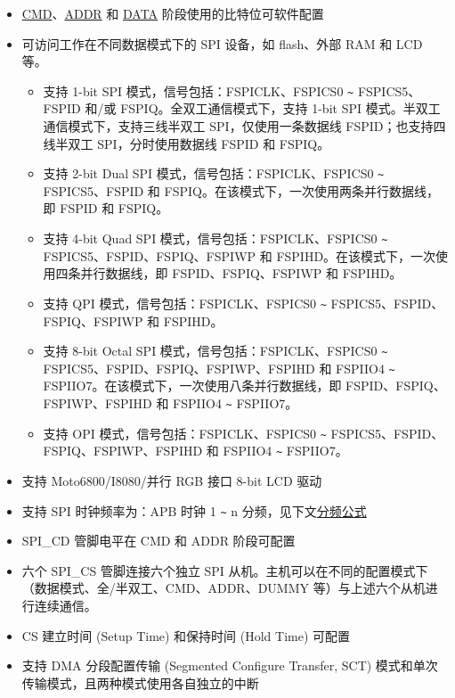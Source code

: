 \documentclass[main\_\_CN.tex]{subfiles}
\begin{document}
\begin{itemize}
    \item \hyperref[phase:cmd]{CMD}、\hyperref[phase:addr]{ADDR} 和 \hyperref[phase:data]{DATA} 阶段使用的比特位可软件配置
    \item 可访问工作在不同数据模式下的 SPI 设备，如 flash、外部 RAM 和 LCD 等。
    \begin{itemize}
      \item 支持 1-bit SPI 模式，信号包括：FSPICLK、FSPICS0 \verb+~+ FSPICS5、FSPID 和/或 FSPIQ。全双工通信模式下，支持 1-bit SPI 模式。半双工通信模式下，支持三线半双工 SPI，仅使用一条数据线 FSPID；也支持四线半双工 SPI，分时使用数据线 FSPID 和 FSPIQ。
      \item 支持 2-bit Dual SPI 模式，信号包括：FSPICLK、FSPICS0 \verb+~+ FSPICS5、FSPID 和 FSPIQ。在该模式下，一次使用两条并行数据线，即 FSPID 和 FSPIQ。

      \item 支持 4-bit Quad SPI 模式，信号包括：FSPICLK、FSPICS0 \verb+~+ FSPICS5、FSPID、FSPIQ、FSPIWP 和 FSPIHD。在该模式下，一次使用四条并行数据线，即 FSPID、FSPIQ、FSPIWP 和 FSPIHD。

      \item 支持 QPI 模式，信号包括：FSPICLK、FSPICS0 \verb+~+ FSPICS5、FSPID、FSPIQ、FSPIWP 和 FSPIHD。

      \item 支持 8-bit Octal SPI 模式，信号包括：FSPICLK、FSPICS0 \verb+~+ FSPICS5、FSPID、FSPIQ、FSPIWP、FSPIHD 和 FSPIIO4 \verb+~+ FSPIIO7。在该模式下，一次使用八条并行数据线，即 FSPID、FSPIQ、FSPIWP、FSPIHD 和 FSPIIO4 \verb+~+ FSPIIO7。

      \item 支持 OPI 模式，信号包括：FSPICLK、FSPICS0 \verb+~+ FSPICS5、FSPID、FSPIQ、FSPIWP、FSPIHD 和 FSPIIO4 \verb+~+ FSPIIO7。
    \end{itemize}

    \item 支持 Moto6800/I8080/并行 RGB 接口 8-bit LCD 驱动
    \item 支持 SPI 时钟频率为：APB 时钟 1 \verb+~+ n 分频，见下文\hyperref[division-formula]{分频公式}
    \item SPI\_CD 管脚电平在 CMD 和 ADDR 阶段可配置
    \item 六个 SPI\_CS 管脚连接六个独立 SPI 从机。主机可以在不同的配置模式下（数据模式、全/半双工、CMD、ADDR、DUMMY 等）与上述六个从机进行连续通信。
    \item CS 建立时间 (Setup Time) 和保持时间 (Hold Time) 可配置
    \item 支持 DMA 分段配置传输 (Segmented Configure Transfer, SCT) 模式和单次传输模式，且两种模式使用各自独立的中断
\end{itemize}
\end{document}
